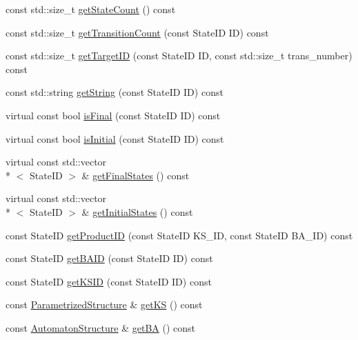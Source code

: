 \begin{DoxyCompactItemize}
\item 
const std\-::size\-\_\-t \hyperlink{class_product_structure_ac0a99d6e42274a4569ead934762b13ed}{get\-State\-Count} () const 
\item 
const std\-::size\-\_\-t \hyperlink{class_product_structure_a79e1851d3f6cd59cc889d5563b773e9c}{get\-Transition\-Count} (const State\-I\-D I\-D) const 
\item 
const std\-::size\-\_\-t \hyperlink{class_product_structure_a5f1a3c413f86b67c0b5fa189206700c0}{get\-Target\-I\-D} (const State\-I\-D I\-D, const std\-::size\-\_\-t trans\-\_\-number) const 
\item 
const std\-::string \hyperlink{class_product_structure_a7289139155ddc2de8bde4bb7f7f1fc20}{get\-String} (const State\-I\-D I\-D) const 
\item 
virtual const bool \hyperlink{class_product_structure_af856dfb18ae32620357e49a2aeaaf882}{is\-Final} (const State\-I\-D I\-D) const 
\item 
virtual const bool \hyperlink{class_product_structure_ab72b9e2ee9dc047e9ae20b7ea0057db2}{is\-Initial} (const State\-I\-D I\-D) const 
\item 
virtual const std\-::vector\\*
$<$ State\-I\-D $>$ \& \hyperlink{class_product_structure_a0bbd0af5cc060a17fb5dbba279b93f47}{get\-Final\-States} () const 
\item 
virtual const std\-::vector\\*
$<$ State\-I\-D $>$ \& \hyperlink{class_product_structure_ad1aeec291cf9951d2a9a003c4620b7ff}{get\-Initial\-States} () const 
\item 
const State\-I\-D \hyperlink{class_product_structure_ae31dfee5c8773eb9d9e4aedcd98240b9}{get\-Product\-I\-D} (const State\-I\-D K\-S\-\_\-\-I\-D, const State\-I\-D B\-A\-\_\-\-I\-D) const 
\item 
const State\-I\-D \hyperlink{class_product_structure_a3402ed0288f40d164fa72aea2dc55354}{get\-B\-A\-I\-D} (const State\-I\-D I\-D) const 
\item 
const State\-I\-D \hyperlink{class_product_structure_ab479c6acbcbe641369e706c4ab8e4db7}{get\-K\-S\-I\-D} (const State\-I\-D I\-D) const 
\item 
const \hyperlink{class_parametrized_structure}{Parametrized\-Structure} \& \hyperlink{class_product_structure_a8b6e67be936d93e137550c87452bf933}{get\-K\-S} () const 
\item 
const \hyperlink{class_automaton_structure}{Automaton\-Structure} \& \hyperlink{class_product_structure_a3f56836cca2794ae69ce79db9c969bdc}{get\-B\-A} () const 

\end{DoxyCompactItemize}

